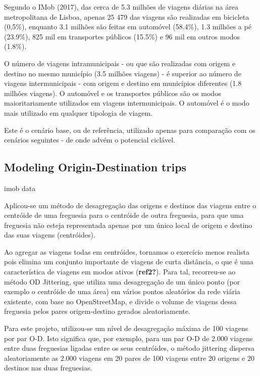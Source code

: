 \documentclass[runningheads]{llncs}
\begin{document}
Segundo o IMob (2017), das cerca de 5.3 milhões de viagens diárias na
área metropolitana de Lisboa, apenas 25 479 das viagens são realizadas
em bicicleta (0,5\%), enquanto 3.1 milhões são feitas em automóvel
(58.4\%), 1.3 milhões a pé (23.9\%), 825 mil em transportes públicos
(15.5\%) e 96 mil em outros modos (1.8\%).

O número de viagens intramunicipais - ou que são realizadas com origem e
destino no mesmo município (3.5 milhões viagens) - é superior ao número
de viagens intermunicipais - com origem e destino em municípios
diferentes (1.8 milhões viagens). O automóvel e os transportes públicos
são os modos maioritariamente utilizados em viagens intermunicipais. O
automóvel é o modo mais utilizado em qualquer tipologia de viagem.

Este é o cenário base, ou de referência, utilizado apenas para
comparação com os cenários seguintes - de onde advém o potencial
ciclável.

\hypertarget{modeling-origin-destination-trips}{%
\subsection{Modeling Origin-Destination
trips}\label{modeling-origin-destination-trips}}

imob data

Aplicou-se um método de desagregação das origens e destinos das viagens
entre o centróide de uma freguesia para o centróide de outra freguesia,
para que uma freguesia não esteja representada apenas por um único local
de origem e destino das suas viagens (centróides).

Ao agregar as viagens todas em centróides, tornamos o exercício menos
realista pois elimina um conjunto importante de viagens de curta
distância, o que é uma característica de viagens em modos ativos
(\textbf{ref2?}). Para tal, recorreu-se ao método OD Jittering, que
utiliza uma desagregação de um único ponto (por exemplo o centróide de
uma área) em vários pontos aleatórios da rede viária existente, com base
no OpenStreetMap, e divide o volume de viagens dessa freguesia pelos
pares origem-destino gerados aleatoriamente.

Para este projeto, utilizou-se um nível de desagregação máxima de 100
viagens por par O-D. Isto significa que, por exemplo, para um par O-D de
2.000 viagens entre duas freguesias ligadas entre os seus centróides, o
método jittering dispersa aleatoriamente as 2.000 viagens em 20 pares de
100 viagens entre 20 origens e 20 destinos nas duas freguesias.
\end{document}
